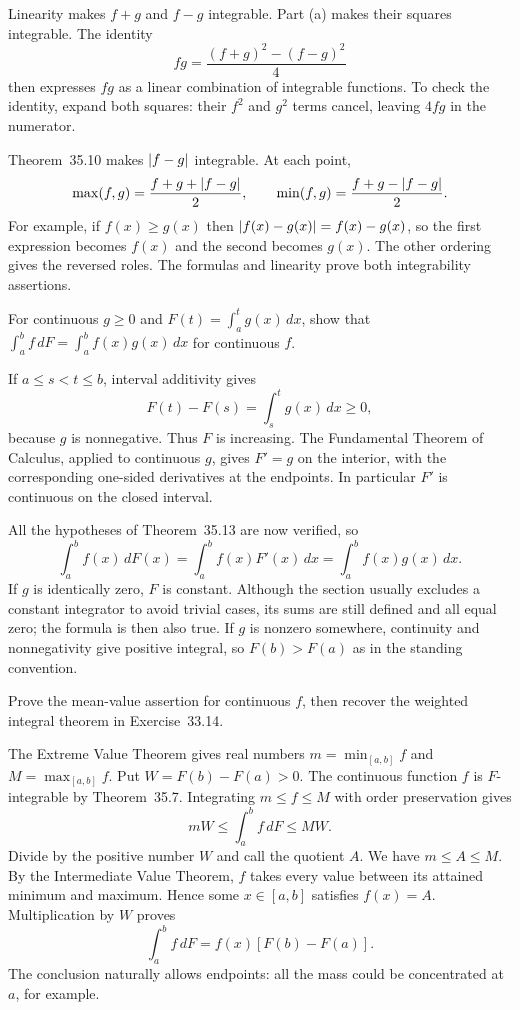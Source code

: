 Linearity makes $f+g$ and $f-g$ integrable. Part (a) makes their
squares integrable. The identity
\[
 fg=\frac{(f+g)^2-(f-g)^2}{4}
\]
then expresses $fg$ as a linear combination of integrable functions.
To check the identity, expand both squares: their $f^2$ and $g^2$
terms cancel, leaving $4fg$ in the numerator.

Theorem~35.10 makes $\left|f-g\right|$ integrable. At each point,
\[
 \max(f,g)=\frac{f+g+\left|f-g\right|}2,\qquad
 \min(f,g)=\frac{f+g-\left|f-g\right|}2.
\]
For example, if $f(x)\ge g(x)$ then $\left|f(x)-g(x)\right|=f(x)-g(x)$,
so the first expression becomes $f(x)$ and the second becomes
$g(x)$. The other ordering gives the reversed roles. The formulas
and linearity prove both integrability assertions.

\goal For continuous $g\ge0$ and $F(t)=\int_a^tg(x)\,dx$, show
that $\int_a^bf\,dF=\int_a^bf(x)g(x)\,dx$ for continuous $f$.

If $a\le s<t\le b$, interval additivity gives
\[
 F(t)-F(s)=\int_s^tg(x)\,dx\ge0,
\]
because $g$ is nonnegative. Thus $F$ is increasing. The Fundamental
Theorem of Calculus, applied to continuous $g$, gives $F'=g$ on
the interior, with the corresponding one-sided derivatives at the
endpoints. In particular $F'$ is continuous on the closed interval.

All the hypotheses of Theorem~35.13 are now verified, so
\[
 \int_a^bf(x)\,dF(x)
 =\int_a^bf(x)F'(x)\,dx
 =\int_a^bf(x)g(x)\,dx.
\]
If $g$ is identically zero, $F$ is constant. Although the section
usually excludes a constant integrator to avoid trivial cases, its
sums are still defined and all equal zero; the formula is then also
true. If $g$ is nonzero somewhere, continuity and nonnegativity
give positive integral, so $F(b)>F(a)$ as in the standing convention.

\goal Prove the mean-value assertion for continuous $f$, then
recover the weighted integral theorem in Exercise~33.14.

The Extreme Value Theorem gives real numbers
$m=\min_{[a,b]}f$ and $M=\max_{[a,b]}f$. Put $W=F(b)-F(a)>0$.
The continuous function $f$ is $F$-integrable by Theorem~35.7.
Integrating $m\le f\le M$ with order preservation gives
\[
 mW\le\int_a^bf\,dF\le MW.
\]
Divide by the positive number $W$ and call the quotient $A$.
We have $m\le A\le M$. By the Intermediate Value Theorem,
$f$ takes every value between its attained minimum and maximum.
Hence some $x\in[a,b]$ satisfies $f(x)=A$. Multiplication by $W$
proves
\[
 \int_a^bf\,dF=f(x)[F(b)-F(a)].
\]
The conclusion naturally allows endpoints: all the mass could be
concentrated at $a$, for example.

